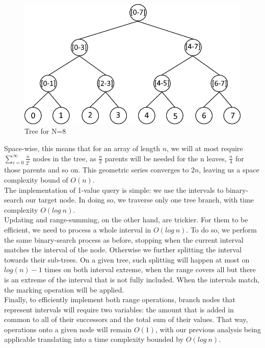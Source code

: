 \documentclass[a4paper]{article}
\begin{document}
\begin{figure}[htbp]
\centering
\includegraphics[scale=0.45]{Tree.png}
\caption{Tree for N=8}
\end{figure}
Space-wise, this means that for an array of length \(n\), we will at
most require \(\sum\limits_{i=0}^{\infty} \frac{n}{2^i}\) nodes in the
tree, as \(\frac{n}{2}\) parents will be needed for the n leaves,
\(\frac{n}{4}\) for those parents and so on. This geometric series
converges to \(2n\), leaving us a space complexity bound of \(O(n)\).\\
The implementation of 1-value query is simple: we use the intervals
to binary-search our target node. In doing so, we traverse only one tree
branch, with time complexity \(O(log\ n)\).\\
Updating and range-summing, on the other hand, are trickier. For them to
be efficient, we need to process a whole interval in \(O(log\ n)\).
To do so, we perform the same binary-search process as before, stopping
when the current interval matches the interval of the node. Otherwise we further splitting the interval towards their sub-trees.
On a given tree, such splitting will happen at most on \(log(n)- 1\)
times on both interval extreme, when the range covers all but there is an extreme of the
interval that is not fully included. When the intervals match, the marking operation will be applied.
\\
Finally, to efficiently implement both range operations, branch nodes
that represent intervals will require two variables: the amount that is
added in common to all of their successors and the total sum of their
values. That way, operations onto a given node will remain \(O(1)\),
with our previous analysis being applicable translating into a time
complexity bounded by \(O(log\ n)\).
\newpage \qquad \\
\end{document}
